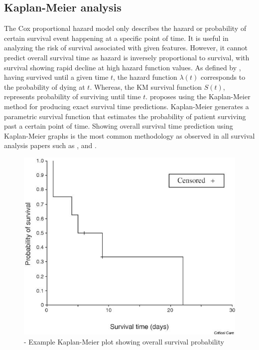 \documentclass{l4proj}
\begin{document}
\subsection{Kaplan-Meier analysis}
The Cox proportional hazard model only describes the hazard or probability of certain survival event happening at a specific point of time. It is useful in analyzing the risk of survival associated with given features. However, it cannot predict overall survival time as hazard is inversely proportional to survival, with survival showing rapid decline at high hazard function values. As defined by \cite{bewick2004statistics}, having survived until a given time \(t\), the hazard function \(\lambda (t)\) corresponds to the probability of dying at \(t\). Whereas, the KM survival function \(S(t)\), represents probability of surviving until time \(t\). \cite{schober2021kaplan} proposes using the Kaplan-Meier method for producing exact survival time predictions. Kaplan-Meier generates a parametric survival function that estimates the probability of patient surviving past a certain point of time. Showing overall survival time prediction using Kaplan-Meier graphs is the most common methodology as observed in all survival analysis papers such as \cite{Kather2019}, \cite{Liu2022} and \cite{Wetstein2022}.

\begin{figure}[h]
    \centering
    \includegraphics[scale=0.3]{images/KM-plot-example.jpg}
    \caption{\cite{bewick2004statistics} - Example Kaplan-Meier plot showing overall survival probability }
    \label{fig:km-plot-example}
\end{figure}
\end{document}
